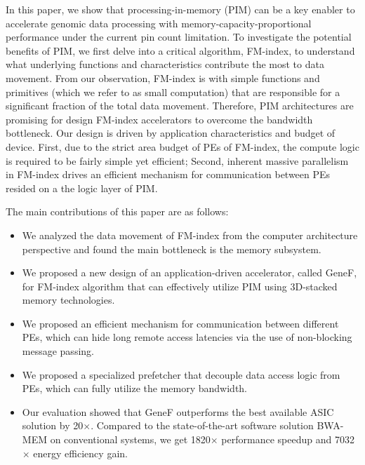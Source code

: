 \documentclass[9pt,conference]{IEEEtran}
\begin{document}
In this paper, we show that processing-in-memory (PIM) can be a key enabler to accelerate genomic data processing with memory-capacity-proportional performance under the current pin count limitation. 
To investigate the potential benefits of PIM, we first delve into a critical algorithm, FM-index, to understand what underlying functions and characteristics contribute the most to data movement. From our observation, FM-index is with simple functions and primitives (which we refer to as small computation) that are responsible for a significant fraction of the total data movement. Therefore, PIM architectures are promising for design FM-index accelerators to overcome the bandwidth bottleneck. Our design is driven by application characteristics and budget of device. First, due to the strict area budget of PEs of FM-index, the compute logic is required to be fairly simple yet efficient; Second, inherent massive parallelism in FM-index drives an efficient mechanism for communication between PEs resided on a the logic layer of PIM. 

The main contributions of this paper are as follows:

\begin{itemize}

    \item We analyzed the data movement of FM-index from the computer architecture perspective and found the main bottleneck is the memory subsystem.
    
    \item We proposed a new design of an application-driven accelerator, called GeneF, for FM-index algorithm that can effectively utilize PIM using 3D-stacked memory technologies.
    
    \item We proposed an efficient mechanism for communication between different PEs, which can hide long remote access latencies via the use of non-blocking message passing.
    
    \item We proposed a specialized prefetcher that decouple data access logic from PEs, which can fully utilize the memory bandwidth.
    
    \item Our evaluation showed that GeneF outperforms the best available ASIC solution by 20$\times$. Compared to the state-of-the-art software solution BWA-MEM on conventional systems, we get 1820$\times$ performance speedup and 7032$\times$ energy efficiency gain.
\end{itemize}
\end{document}
